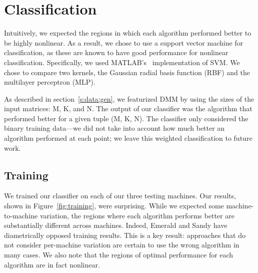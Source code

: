 \section{Classification}
\label{s:class}
Intuitively, we expected the regions in which each algorithm performed better to be highly nonlinear.
As a result, we chose to use a support vector machine for classification, as these are known to have good performance for nonlinear classification.
Specifically, we used MATLAB's~ implementation of SVM.
We chose to compare two kernels, the Gaussian radial basis function (RBF) and the multilayer perceptron (MLP).

As described in section~\ref{s:data:gen}, we featurized DMM by using the sizes of the input matrices: M, K, and N.
The output of our classifier was the algorithm that performed better for a given tuple (M, K, N).
The classifier only considered the binary training data---we did not take into account how much better an algorithm performed at each point; we leave this weighted classification to future work.

\subsection{Training}
We trained our classifier on each of our three testing machines.
Our results, shown in Figure~\ref{fig:training}, were surprising.
While we expected some machine-to-machine variation, the regions where each algorithm performs better are substantially different across machines.
Indeed, Emerald and Sandy have diametrically opposed training results.
This is a key result: approaches that do not consider per-machine variation are certain to use the wrong algorithm in many cases.
We also note that the regions of optimal performance for each algorithm are in fact nonlinear.

